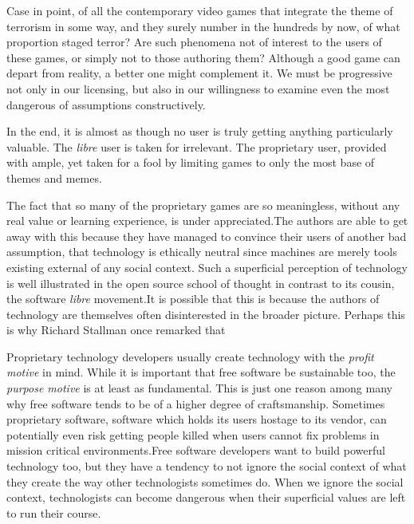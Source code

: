 Case in point, of all the contemporary video games that integrate the theme of terrorism in some way, and they surely number in the hundreds by now, of what proportion staged terror? Are such phenomena not of interest to the users of these games, or simply not to those authoring them? Although a good game can depart from reality, a better one might complement it. We must be progressive not only in our licensing, but also in our willingness to examine even the most dangerous of assumptions constructively. 

In the end, it is almost as though no user is truly getting anything particularly valuable. The {\it libre} user is taken for irrelevant. The proprietary user, provided with ample, yet taken for a fool by limiting games to only the most base of themes and memes.

The fact that so many of the proprietary games are so meaningless, without any real value or learning experience, is under appreciated. The authors are able to get away with this because they have managed to convince their users of another bad assumption, that technology is ethically neutral since machines are merely tools existing external of any social context. Such a superficial perception of technology is well illustrated in the open source school of thought in contrast to its cousin, the software {\it libre} movement. It is possible that this is because the authors of technology are themselves often disinterested in the broader picture. Perhaps this is why Richard Stallman once remarked that \footnotecite[auza2008]

Proprietary technology developers usually create technology with the {\it profit motive} in mind. While it is important that free software be sustainable too, the {\it purpose motive} is at least as fundamental. This is just one reason among many why free software tends to be of a higher degree of craftsmanship. Sometimes proprietary software, software which holds its users hostage to its vendor, can potentially even risk getting people killed when users cannot fix problems in mission critical environments. Free software developers want to build powerful technology too, but they have a tendency to not ignore the social context of what they create the way other technologists sometimes do. When we ignore the social context, technologists can become dangerous when their superficial values are left to run their course.\footnotecite[black2012]\footnotecite[brew2012]

